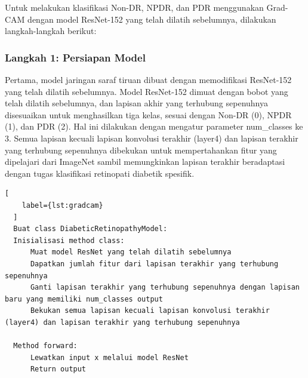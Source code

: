 %
Untuk melakukan klasifikasi Non-DR, NPDR, dan PDR menggunakan Grad-CAM dengan model ResNet-152 yang telah dilatih sebelumnya, dilakukan langkah-langkah berikut:

\subsubsection{Langkah 1: Persiapan Model}
Pertama, model jaringan saraf tiruan dibuat dengan memodifikasi ResNet-152 yang telah dilatih sebelumnya. 
Model ResNet-152 dimuat dengan bobot yang telah dilatih sebelumnya, dan lapisan akhir yang terhubung sepenuhnya disesuaikan untuk menghasilkan tiga kelas, sesuai dengan Non-DR (0), NPDR (1), dan PDR (2). 
Hal ini dilakukan dengan mengatur parameter num\_classes ke 3. 
Semua lapisan kecuali lapisan konvolusi terakhir (layer4) dan lapisan terakhir yang terhubung sepenuhnya dibekukan untuk mempertahankan fitur yang dipelajari dari ImageNet sambil memungkinkan lapisan terakhir beradaptasi dengan tugas klasifikasi retinopati diabetik spesifik. 

\begin{lstlisting}[
	label={lst:gradcam}
  ]
  Buat class DiabeticRetinopathyModel:
  Inisialisasi method class:
	  Muat model ResNet yang telah dilatih sebelumnya
	  Dapatkan jumlah fitur dari lapisan terakhir yang terhubung sepenuhnya
	  Ganti lapisan terakhir yang terhubung sepenuhnya dengan lapisan baru yang memiliki num_classes output
	  Bekukan semua lapisan kecuali lapisan konvolusi terakhir (layer4) dan lapisan terakhir yang terhubung sepenuhnya

  Method forward:
	  Lewatkan input x melalui model ResNet
	  Return output
\end{lstlisting}
%

